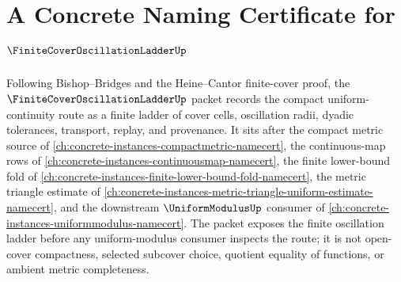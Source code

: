 \chapter{A Concrete Naming Certificate for $\FiniteCoverOscillationLadderUp$}
\label{ch:concrete-instances-finite-cover-oscillation-ladder-namecert}

Following Bishop--Bridges and the Heine--Cantor finite-cover proof, the $\FiniteCoverOscillationLadderUp$ packet records the compact uniform-continuity route as a finite ladder of cover cells, oscillation radii, dyadic tolerances, transport, replay, and provenance. It sits after the compact metric source of \autoref{ch:concrete-instances-compactmetric-namecert}, the continuous-map rows of \autoref{ch:concrete-instances-continuousmap-namecert}, the finite lower-bound fold of \autoref{ch:concrete-instances-finite-lower-bound-fold-namecert}, the metric triangle estimate of \autoref{ch:concrete-instances-metric-triangle-uniform-estimate-namecert}, and the downstream $\UniformModulusUp$ consumer of \autoref{ch:concrete-instances-uniformmodulus-namecert}. The packet exposes the finite oscillation ladder before any uniform-modulus consumer inspects the route; it is not open-cover compactness, selected subcover choice, quotient equality of functions, or ambient metric completeness.

